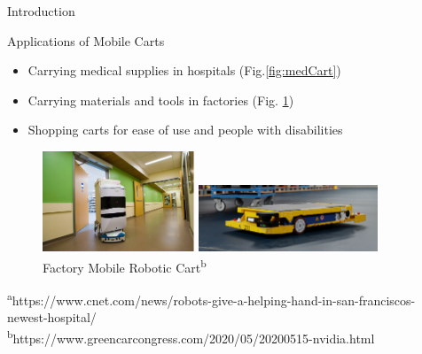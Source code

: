 \documentclass{beamer}
\begin{document}
\begin{frame}{Introduction}{}
  \begin{block}{Applications of Mobile Carts}
    \begin{itemize}
      \item Carrying medical supplies in hospitals (Fig.\ref{fig:medCart})
      \item Carrying materials and tools in factories (Fig. \ref{fig:factCart})
      \item Shopping carts for ease of use and people with disabilities
    \end{itemize}
  \end{block}
      \begin{figure}
      \centering
      \begin{minipage}[t]{0.5\textwidth}
        \centering
        \includegraphics[height=3.0cm]{figs/img/MedicalRoboticCart}
        \caption{Medical Mobile Robotic Cart\textsuperscript{a}}
        \label{fig:medCart}
      \end{minipage}
      \begin{minipage}[t]{0.4\textwidth}
        \centering
        \includegraphics[height=2.0cm]{figs/img/FactoryRoboticCart}
        \caption{Factory Mobile Robotic Cart\textsuperscript{b}}
        \label{fig:factCart}
      \end{minipage}
      \end{figure}
    \begin{tiny}
      \textsuperscript{a}https://www.cnet.com/news/robots-give-a-helping-hand-in-san-franciscos-newest-hospital/\\
      \textsuperscript{b}https://www.greencarcongress.com/2020/05/20200515-nvidia.html
    \end{tiny}
\end{frame}
\end{document}
